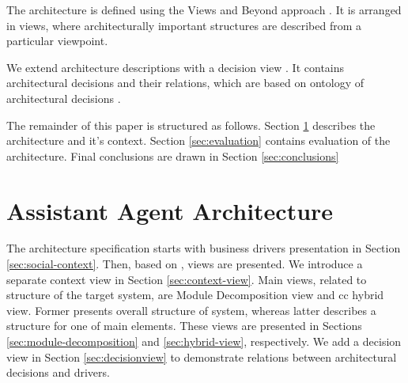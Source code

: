 \documentclass{llncs}
\begin{document}
The architecture is defined using the Views and Beyond approach \cite{bachmann2010documenting}. It is arranged in views, where architecturally important structures are described from a particular viewpoint.

We extend architecture descriptions with a decision view \cite{kruchten2009decision}. It contains architectural decisions and their relations, which are based on ontology of architectural decisions \cite{kruchten2004Ontology}.

The remainder of this paper is structured as follows. Section \ref{sec:architecture} describes the architecture and it's context. Section \ref{sec:evaluation} contains evaluation of the architecture. Final conclusions are drawn in Section \ref{sec:conclusions}


\section{Assistant Agent Architecture}
\label{sec:architecture}
The architecture specification starts with business drivers presentation in Section \ref{sec:social-context}. Then, based on \cite{bachmann2010documenting}, views are presented. We introduce a separate context view in Section \ref{sec:context-view}. Main views, related to structure of the target system, are Module Decomposition view and \gls{cc} hybrid view. Former presents overall structure of system, whereas latter describes a structure for one of main elements. These views are presented in Sections \ref{sec:module-decomposition} and \ref{sec:hybrid-view}, respectively. We add a decision view in Section \ref{sec:decisionview} to demonstrate relations between architectural decisions and drivers.
 
\end{document}
